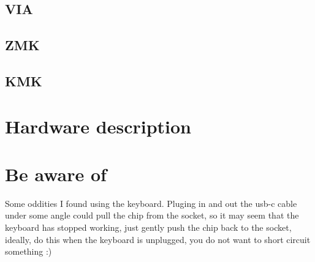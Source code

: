 \documentclass{article}
\begin{document}
\subsection{VIA}

\subsection{ZMK}

\subsection{KMK}

\section{Hardware description}

\section{Be aware of}
Some oddities I found using the keyboard.
Pluging in and out the usb-c cable under some angle could pull the chip from the socket, so it may seem that the keyboard has stopped working, just gently push the chip back to the socket, ideally, do this when the keyboard is unplugged, you do not want to short circuit something :)


\end{document}
